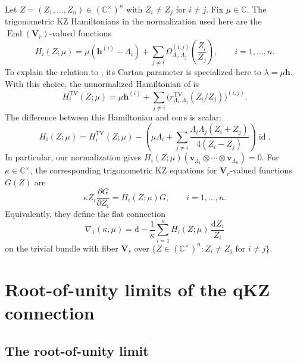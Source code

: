 \documentclass[12pt]{amsart}
\theoremstyle{definition}
\numberwithin{equation}{section}
\theoremstyle{definition}
\let\ka\kappa
\let\La\Lambda
\let\Om\Omega
\let\ox\otimes
\let\on\operatorname
\def\C{{\mathbb C}}
\def\End{\on{End}}
\def\id{\on{id}}
\def\beq{\begin{equation}}
\def\eeq{\end{equation}}
\begin{document}
Let $Z=(Z_1,\ldots,Z_n)\in(\C^\times)^n$ with
$Z_i\ne Z_j$ for $i\ne j$.  Fix $\mu\in\C$.  The trigonometric
KZ Hamiltonians in the normalization used here are the
$\End(\mathbf V_r)$-valued functions
\beq\label{eq:H}
 H_i(Z;\mu)=\mu(\mathbf h^{(i)}-\La_i)
 +\sum_{j\ne i}\Om_{\La_i,\La_j}^{(i,j)}
       \left(\frac{Z_i}{Z_j}\right),\qquad i=1,\ldots,n.
\eeq
To explain the relation to \cite[Section~2.2]{TV00},
its Cartan parameter is specialized here to
$\lambda=\mu\mathbf h$.  With this choice, the unnormalized
Hamiltonian of \cite{TV00} is
\[
 H_i^{\mathrm{TV}}(Z;\mu)
 =\mu\mathbf h^{(i)}
 +\sum_{j\ne i}\bigl(r^{\mathrm{TV}}_{\La_i,\La_j}
 (Z_i/Z_j)\bigr)^{(i,j)}.
\]
The difference between this Hamiltonian and ours is scalar:
\[
 H_i(Z;\mu)=H_i^{\mathrm{TV}}(Z;\mu)
 -\left(\mu\La_i+\sum_{j\ne i}
 \frac{\La_i\La_j(Z_i+Z_j)}{4(Z_i-Z_j)}\right)\id.
\]
In particular, our normalization gives
$H_i(Z;\mu)(\mathbf v_{\La_1}\ox\cdots\ox\mathbf v_{\La_n})=0$.
For $\ka\in\C^\times$, the corresponding trigonometric KZ
equations for $\mathbf V_r$-valued functions $G(Z)$ are
\beq\label{eq:KZ}
 \ka Z_i\frac{\partial G}{\partial Z_i}
 =H_i(Z;\mu)G,\qquad i=1,\ldots,n.
\eeq
Equivalently, they define the flat connection
\beq\label{eq:nabla}
 \nabla_1(\ka,\mu)
 =\mathrm{d}-\frac1\ka\sum_{i=1}^n
 H_i(Z;\mu)\,\frac{\mathrm{d}Z_i}{Z_i}
\eeq
on the trivial bundle with fiber $\mathbf V_r$ over
$\{Z\in(\C^\times)^n:Z_i\ne Z_j\text{ for }i\ne j\}$.

\section{Root-of-unity limits of the qKZ connection}\label{sec:connection-limits}

\subsection{The root-of-unity limit}\label{sec:theorem}
\end{document}
